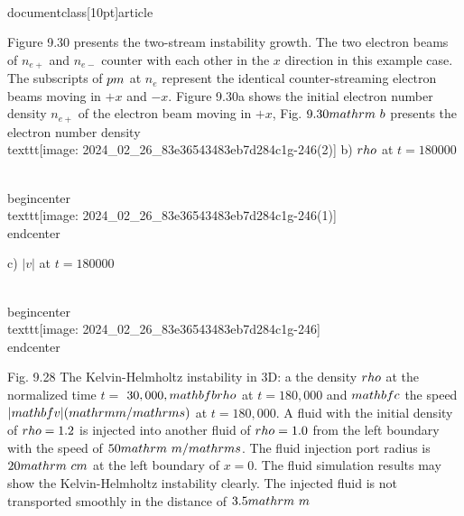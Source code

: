 \\documentclass[10pt]{article}
\begin{document}
{{{{{{Figure 9.30 presents the two-stream instability growth. The two electron beams of $n_{e+}$ and $n_{e-}$ counter with each other in the $x$ direction in this example case. The subscripts of $\\pm$ at $n_{e}$ represent the identical counter-streaming electron beams moving in $+x$ and $-x$. Figure 9.30a shows the initial electron number density $n_{e+}$ of the electron beam moving in $+x$, Fig. $9.30 \\mathrm{~b}$ presents the electron number density
\\texttt{[image: 2024\_02\_26\_83e36543483eb7d284c1g-246(2)]}
b) $\\rho$ at $t=180000$

\\begin{center}
\\texttt{[image: 2024\_02\_26\_83e36543483eb7d284c1g-246(1)]}
\\end{center}

c) $|v|$ at $t=180000$

\\begin{center}
\\texttt{[image: 2024\_02\_26\_83e36543483eb7d284c1g-246]}
\\end{center}

Fig. 9.28 The Kelvin-Helmholtz instability in 3D: a the density $\\rho$ at the normalized time $t=$ $30,000, \\mathbf{b} \\rho$ at $t=180,000$ and $\\mathbf{c}$ the speed $|\\mathbf{v}|(\\mathrm{m} / \\mathrm{s})$ at $t=180,000$. A fluid with the initial density of $\\rho=1.2$ is injected into another fluid of $\\rho=1.0$ from the left boundary with the speed of $50 \\mathrm{~m} / \\mathrm{s}$. The fluid injection port radius is $20 \\mathrm{~cm}$ at the left boundary of $x=0$. The fluid simulation results may show the Kelvin-Helmholtz instability clearly. The injected fluid is not transported smoothly in the distance of $3.5 \\mathrm{~m}$

}}}}}}
\end{document}
